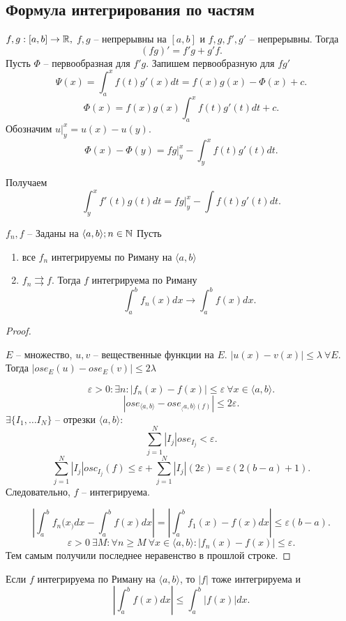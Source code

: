 \documentclass[11pt]{book}
\begin{document}
\subsection{Формула интегрирования по частям}
$ f, g : [a, b] \to  \mathbb{R}, $ $ f, g$ -- непрерывны на $ [a, b]$ и $ f, g, f', g'$ -- непрерывны.
Тогда \[
    (fg)' = f' g+g'f
.\]
Пусть $ \Phi$ -- первообразная для $ f' g$.
Запишем первообразную для $ fg'$
\[
    \Psi (x) = \int_a^{x} f(t) g'(x) dt = f(x) g(x) - \Phi (x) + c
.\]
\[
    \Phi (x) = f(x) g(x) \int_a^{x} f(t) g'(t) dt + c
.\]
Обозначим $ u |_y^{x} = u(x) - u(y)$.
\[
    \Phi (x) - \Phi(y) = fg |_y^{x} - \int_y^{x} f(t)g'(t)dt
.\]

Получаем
\[
    \int_y^{x} f'(t) g(t) dt = fg |_y^{x} - \int f(t) g'(t) dt
.\]
\begin{thm}
    $ f_n, f$ -- Заданы на $ \langle a, b \rangle; n \in \mathbb{N}$
    Пусть
    \begin{enumerate}
	\item все $ f_n$ интегрируемы по Риману на $ \langle a, b \rangle$
	\item $ f_n \rightrightarrows f$. Тогда  $ f$ интегрируема по Риману
	    \[
		\int_a^{b}f_n(x) dx \to \int_a^{b}f(x) dx
	    .\]
    \end{enumerate}
\end{thm}
\begin{proof}
    \begin{lm}
	$ E$ -- множество, $ u, v $ -- вещественные функции на $ E$. $ |u(x) - v(x) | \le  \lambda ~ \forall  E.$
	Тогда $ |ose_E(u) - ose_E(v) | \le  2 \lambda$
    \end{lm}
    \[
	\varepsilon  >0: \exists  n: |f_n(x) - f(x)| \le \varepsilon ~ \forall x \in  \langle a, b \rangle
    .\]
    \[
	|ose_{\langle a, b \rangle} - ose_{_\langle a, b \rangle(f)}| \le 2 \varepsilon
    .\]
    $\exists  \{I_1, \ldots I_N \} $ -- отрезки $ \langle  a, b \rangle$:
    \[
	\sum_{j=1}^{N }|I_j| ose_{I_j} < \varepsilon
    .\]
    \[
	\sum_{j=1}^{N} |I_j| osc_{I_j}(f)  \le  \varepsilon +\sum_{j=1}^{N} |I_j| (2 \varepsilon ) = \varepsilon (2 (b-a) + 1)
    .\]
    Следовательно, $ f$ -- интегрируема.

    \[
	\left|\int_a^{b} f_n(x_) dx - \int _a^{b}f(x) dx \right|= \left|\int_a^{b} f_1(x) - f(x) dx\right| \le  \varepsilon (b-a)
    .\]
    \[
	\varepsilon  >0  ~ \exists M : \forall n \ge M ~ \forall  x \in  \langle a, b \rangle: |f_n(x) - f(x) | \le  \varepsilon
    .\]
    Тем самым получили последнее неравенство в прошлой строке.
\end{proof}
\begin{st}
    Если $ f$ интегрируема по Риману на $ \langle  a,b \rangle$, то $ |f|$ тоже интегрируема и \[
	\left |\int_a ^{b} f(x) dx\right| \le  \int_a^{b} |f(x) |dx
    .\]
\end{st}
\end{document}
